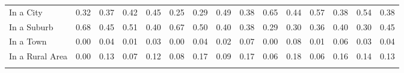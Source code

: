 \begin{tabular*}{\linewidth}{@{\extracolsep{\fill} } lcccccccccccccc}
\hspace{0.2cm}In a City&0.32&0.37&0.42&0.45&0.25&0.29&0.49&0.38&0.65&0.44&0.57&0.38&0.54&0.38\\%
\hspace{0.2cm}In a Suburb&0.68&0.45&0.51&0.40&0.67&0.50&0.40&0.38&0.29&0.30&0.36&0.40&0.30&0.45\\%
\hspace{0.2cm}In a Town&0.00&0.04&0.01&0.03&0.00&0.04&0.02&0.07&0.00&0.08&0.01&0.06&0.03&0.04\\%
\hspace{0.2cm}In a Rural Area&0.00&0.13&0.07&0.12&0.08&0.17&0.09&0.17&0.06&0.18&0.06&0.16&0.14&0.13\\%
&&&&&&&&&&&&&&\\%
\hline%
\end{tabular*}